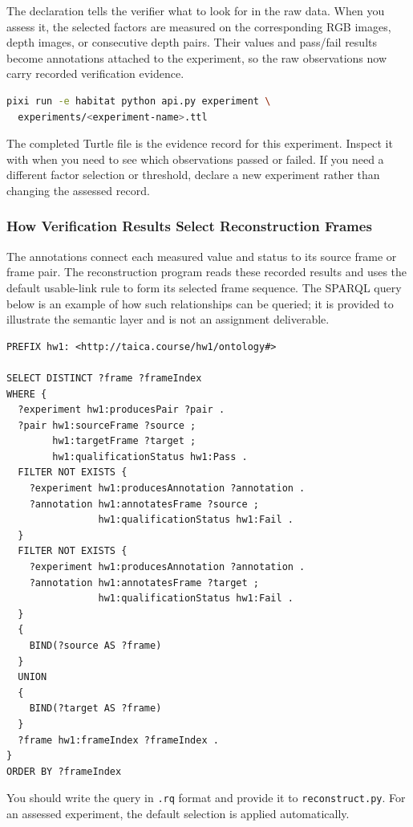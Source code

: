 \documentclass[11pt]{article}
\newcommand{\code}[1]{\texttt{\detokenize{#1}}}
\begin{document}
The declaration tells the verifier what to look for in the raw data. When you
assess it, the selected factors are measured on the corresponding RGB images,
depth images, or consecutive depth pairs. Their values and pass/fail results
become annotations attached to the experiment, so the raw observations now
carry recorded verification evidence.
\begin{lstlisting}[language=bash]
pixi run -e habitat python api.py experiment \
  experiments/<experiment-name>.ttl
\end{lstlisting}
The completed Turtle file is the evidence record for this experiment. Inspect
it with \code{api.py explore} when you need to see which observations passed or
failed. If you need a different factor selection or threshold, declare a new
experiment rather than changing the assessed record.

\subsubsection{How Verification Results Select Reconstruction Frames}

The annotations connect each measured value and status to its source frame or
frame pair. The reconstruction program reads these recorded results and uses
the default usable-link rule to form its selected frame sequence. The SPARQL
query below is an example of how such relationships can be queried; it is
provided to illustrate the semantic layer and is not an assignment deliverable.

\begin{lstlisting}[language=sparql]
PREFIX hw1: <http://taica.course/hw1/ontology#>

SELECT DISTINCT ?frame ?frameIndex
WHERE {
  ?experiment hw1:producesPair ?pair .
  ?pair hw1:sourceFrame ?source ;
        hw1:targetFrame ?target ;
        hw1:qualificationStatus hw1:Pass .
  FILTER NOT EXISTS {
    ?experiment hw1:producesAnnotation ?annotation .
    ?annotation hw1:annotatesFrame ?source ;
                hw1:qualificationStatus hw1:Fail .
  }
  FILTER NOT EXISTS {
    ?experiment hw1:producesAnnotation ?annotation .
    ?annotation hw1:annotatesFrame ?target ;
                hw1:qualificationStatus hw1:Fail .
  }
  {
    BIND(?source AS ?frame)
  }
  UNION
  {
    BIND(?target AS ?frame)
  }
  ?frame hw1:frameIndex ?frameIndex .
}
ORDER BY ?frameIndex
\end{lstlisting}

You should write the query in \texttt{.rq} format and provide it to \texttt{reconstruct.py}. For an assessed experiment, the default selection is applied automatically.
\end{document}
